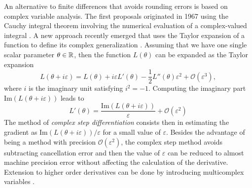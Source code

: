 An alternative to finite differences that avoids rounding errors is based on complex variable analysis. 
The first proposals originated in 1967 using the Cauchy integral theorem involving the numerical evaluation of a complex-valued integral \cite{Lyness_1967, Lyness_Moler_1967}.
A new approach recently emerged that uses the Taylor expansion of a function to define its complex generalization \cite{Squire_Trapp_1998_complex_diff, Martins_Sturdza_Alonso_2003_complex_differentiation}. 
Assuming that we have one single scalar parameter $\theta \in \operatorname{\mathbb{R}}$, then the function $L(\theta)$ can be expanded as 
the Taylor expansion
\begin{equation}
    L(\theta + i \varepsilon)
    = 
    L(\theta) + i \varepsilon L'(\theta) 
    - 
    \frac 1 2
    L''(\theta) \varepsilon^2
    + 
    \mathcal O (\varepsilon^3),
\end{equation}
where $i$ is the imaginary unit satisfying $i^2 = -1$. 
Computing the imaginary part $\text{Im}(L(\theta + i \varepsilon))$ leads to
\begin{equation}
    L'(\theta) 
    = 
    \frac{\text{Im}(L(\theta + i \varepsilon))}{\varepsilon}
    + 
    \mathcal{O} (\varepsilon^2)
\end{equation}
The method of \textit{complex step differentiation} consists then in estimating the gradient as $\text{Im}(L(\theta + i \varepsilon)) / \varepsilon$ for a small value of $\varepsilon$. 
Besides the advantage of being a method with precision $\mathcal{O}(\varepsilon^2)$, the complex step method avoids subtracting cancellation error and then the value of $\varepsilon$ can be reduced to almost machine precision error without affecting the calculation of the derivative. 
Extension to higher order derivatives can be done by introducing multicomplex variables \cite{Lantoine_Russell_Dargent_2012}. 

